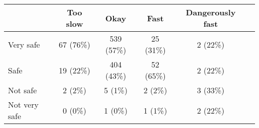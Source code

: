 \begin{tabular}{l c|c|c|c|c} \hline  & Too slow & Okay & Fast & Dangerously fast \\ 
\hline Very safe & 67 (76\%) & 539 (57\%) & 25 (31\%) & 2 (22\%) \\ 
  Safe & 19 (22\%) & 404 (43\%) & 52 (65\%) & 2 (22\%) \\ 
  Not safe & 2 (2\%) & 5 (1\%) & 2 (2\%) & 3 (33\%) \\ 
  Not very safe & 0 (0\%) & 1 (0\%) & 1 (1\%) & 2 (22\%) \\ 
 \hline \end{tabular}